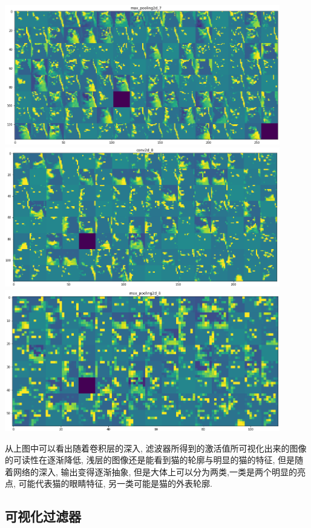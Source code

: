 \documentclass[lang=cn,11pt]{elegantpaper}
\begin{document}
\begin{center}
\includegraphics[width=0.9\textwidth]{max_pooling2d_7}\\
\includegraphics[width=0.9\textwidth]{conv2d_8}\\
\includegraphics[width=0.9\textwidth]{max_pooling2d_8}

\end{center}

从上图中可以看出随着卷积层的深入, 滤波器所得到的激活值所可视化出来的图像的可读性在逐渐降低, 浅层的图像还是能看到猫的轮廓与明显的猫的特征, 但是随着网络的深入, 输出变得逐渐抽象, 但是大体上可以分为两类,一类是两个明显的亮点, 可能代表猫的眼睛特征, 另一类可能是猫的外表轮廓. 

\subsection{可视化过滤器}
\end{document}
